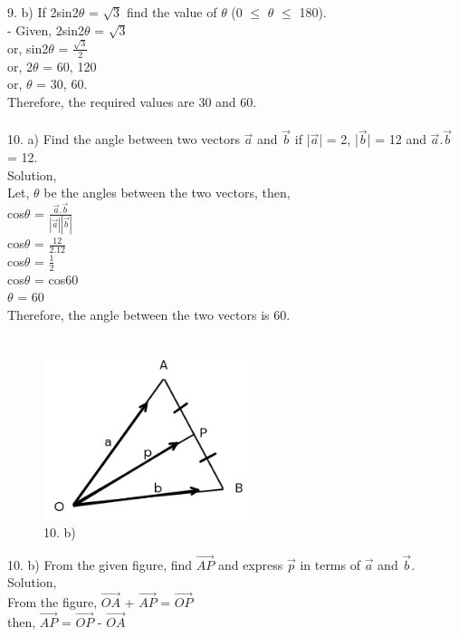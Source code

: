 \documentclass[a4paper,17pt]{extarticle}
\begin{document}
{9. b) If 2sin2$\theta$ = $\sqrt{3}$ find the value of $\theta$ (0 $\leq$ $\theta$ $\leq$ 180). \\
- Given, 2sin2$\theta$ = $\sqrt{3}$ \\
or, sin2$\theta$ = $\frac{\sqrt{3}}{2}$ \\
or, 2$\theta$ = 60, 120 \\
or, $\theta$ = 30, 60. \\
Therefore, the required values are 30 and 60. \\ \\
10. a) Find the angle between two vectors $\overrightarrow{a}$ and $\overrightarrow{b}$ if |$\overrightarrow{a}$| = 2, |$\overrightarrow{b}$| = 12 and $\overrightarrow{a}.\overrightarrow{b}$ = 12. \\
Solution, \\
Let, $\theta$ be the angles between the two vectors, then, \\
cos$\theta$ = $\frac{\overrightarrow{a}.\overrightarrow{b}}{|\overrightarrow{a}||\overrightarrow{b}|}$ \\ 
cos$\theta$ = $\frac{12}{2.12}$ \\ 
cos$\theta$ = $\frac{1}{2}$ \\ 
cos$\theta$ = cos60  \\
$\theta$ = 60\\
Therefore, the angle between the two vectors is 60. \\ \\
\begin{figure}[htp]
    \centering
    \includegraphics[width=6cm]{static/Screenshot from 2023-01-28 15-30-36.png}
    \caption{10. b)}
    \label{fig:question}
\end{figure}
10. b) From the given figure, find $\overrightarrow{AP}$ and express $\overrightarrow{p}$ in terms of $\overrightarrow{a}$ and $\overrightarrow{b}$. 
Solution, \\
From the figure, $\overrightarrow{OA}$ + $\overrightarrow{AP}$ = $\overrightarrow{OP}$ \\
then, $\overrightarrow{AP}$ = $\overrightarrow{OP}$ - $\overrightarrow{OA}$ \\
}
\end{document}
